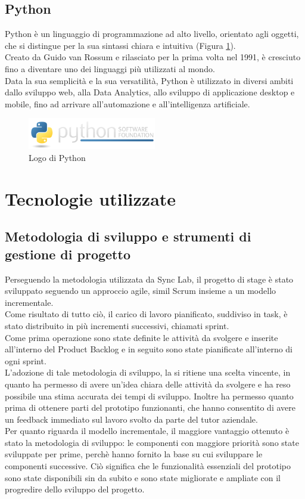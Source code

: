\subsection{Python}
Python è un linguaggio di programmazione ad alto livello, orientato agli oggetti,
che si distingue per la sua sintassi chiara e intuitiva (Figura \ref{fig:python}).\\
Creato da Guido van Rossum e rilasciato per la prima volta nel 1991, è cresciuto fino a 
diventare uno dei linguaggi più utilizzati al mondo.\\
Data la sua semplicità e la sua versatilità, Python è utilizzato in diversi ambiti dallo sviluppo web, alla \gls{Data Analytics}{}, allo sviluppo di applicazione 
desktop e mobile, fino ad arrivare all'automazione e all'intelligenza artificiale.\\
\begin{figure}[hpp]
    \centering
    \includegraphics[width=0.5\textwidth]{images/tecnologie/logo_python.png}
    \caption{Logo di Python}
    \label{fig:python}
\end{figure}
\section{Tecnologie utilizzate}
\subsection{Metodologia di sviluppo e strumenti di gestione di progetto}
Perseguendo la metodologia utilizzata da Sync Lab, il progetto di stage è stato sviluppato seguendo un
approccio \gls{agile}{}, simil \gls{Scrum}{} insieme a un \gls{modello incrementale}{}.\\ 
Come risultato di tutto ciò, il carico di lavoro pianificato, suddiviso in task, è stato distribuito in più incrementi successivi, 
chiamati \gls{sprint}{}.\\
Come prima operazione sono state definite le attività da svolgere e inserite all'interno del \gls{Product Backlog}{} e in seguito 
sono state pianificate all'interno di ogni \gls{sprint}{}.\\
L'adozione di tale metodologia di sviluppo, la si ritiene una scelta vincente, in quanto ha permesso di avere un'idea chiara
delle attività da svolgere e ha reso possibile una stima accurata dei tempi di sviluppo. Inoltre ha permesso quanto prima di ottenere 
parti del prototipo funzionanti, che hanno consentito di avere un feedback immediato sul lavoro svolto da parte del tutor aziendale.\\
Per quanto riguarda il \gls{modello incrementale}{}, il maggiore vantaggio ottenuto è stato la metodologia di sviluppo: le componenti 
con maggiore priorità sono state sviluppate per prime, perchè hanno fornito la base su cui sviluppare le componenti successive. Ciò significa che 
le funzionalità essenziali del prototipo sono state disponibili sin da subito e sono state migliorate e ampliate con il progredire dello sviluppo del progetto.
